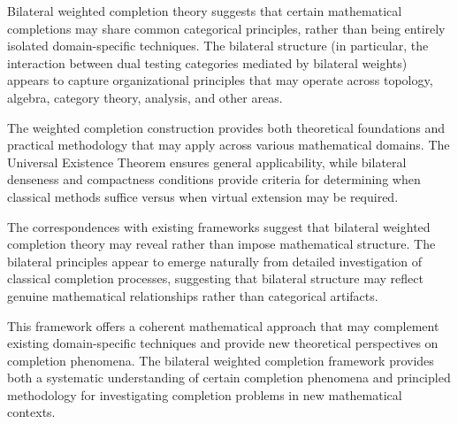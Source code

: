 \documentclass[11pt]{article}
\theoremstyle{plain}
\theoremstyle{definition}
\theoremstyle{remark}
\begin{document}
Bilateral weighted completion theory suggests that certain mathematical completions may share common categorical principles, rather than being entirely isolated domain-specific techniques. The bilateral structure (in particular, the interaction between dual testing categories mediated by bilateral weights) appears to capture organizational principles that may operate across topology, algebra, category theory, analysis, and other areas.

The weighted completion construction provides both theoretical foundations and practical methodology that may apply across various mathematical domains. The Universal Existence Theorem ensures general applicability, while bilateral denseness and compactness conditions provide criteria for determining when classical methods suffice versus when virtual extension may be required.

The correspondences with existing frameworks suggest that bilateral weighted completion theory may reveal rather than impose mathematical structure. The bilateral principles appear to emerge naturally from detailed investigation of classical completion processes, suggesting that bilateral structure may reflect genuine mathematical relationships rather than categorical artifacts.

This framework offers a coherent mathematical approach that may complement existing domain-specific techniques and provide new theoretical perspectives on completion phenomena. The bilateral weighted completion framework provides both a systematic understanding of certain completion phenomena and principled methodology for investigating completion problems in new mathematical contexts.


\end{document}
